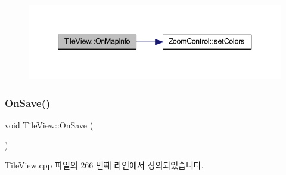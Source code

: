 \nopagebreak
\begin{figure}[H]
\begin{center}
\leavevmode
\includegraphics[width=340pt]{class_tile_view_ae4ba4c47c672fb6e856fbe3921e3667e_cgraph}
\end{center}
\end{figure}
\mbox{\label{class_tile_view_ae318b9ed3c7567dcbc897c77d063a0eb}} 
\subsubsection{\texorpdfstring{On\+Save()}{OnSave()}}
{\footnotesize\ttfamily void Tile\+View\+::\+On\+Save (\begin{DoxyParamCaption}{ }\end{DoxyParamCaption})\hspace{0.3cm}{\ttfamily [protected]}}



Tile\+View.\+cpp 파일의 266 번째 라인에서 정의되었습니다.


